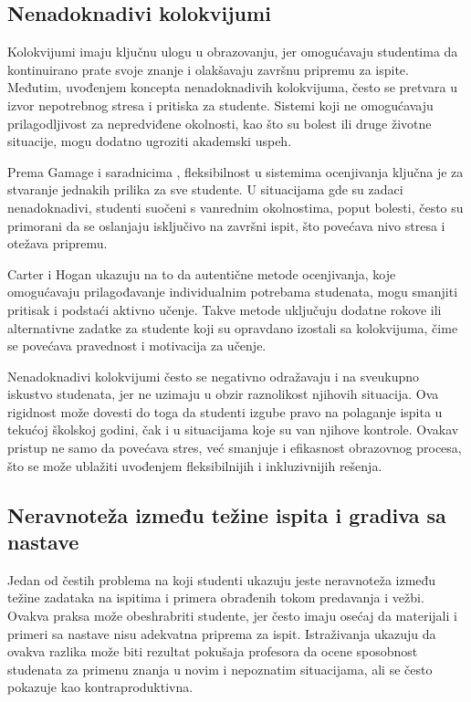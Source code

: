 \documentclass[a4paper]{article}
\begin{document}
\subsection{Nenadoknadivi kolokvijumi}

Kolokvijumi imaju ključnu ulogu u obrazovanju, jer omogućavaju studentima da kontinuirano prate svoje znanje i olakšavaju završnu pripremu za ispite. Međutim, uvođenjem koncepta nenadoknadivih kolokvijuma, često se pretvara u izvor nepotrebnog stresa i pritiska za studente. Sistemi koji ne omogućavaju prilagodljivost za nepredviđene okolnosti, kao što su bolest ili druge životne situacije, mogu dodatno ugroziti akademski uspeh.

Prema Gamage i saradnicima \cite{gamage2022rethinking}, fleksibilnost u sistemima ocenjivanja ključna je za stvaranje jednakih prilika za sve studente. U situacijama gde su zadaci nenadoknadivi, studenti suočeni s vanrednim okolnostima, poput bolesti, često su primorani da se oslanjaju isključivo na završni ispit, što povećava nivo stresa i otežava pripremu.

Carter i Hogan \cite{carter2013authentic} ukazuju na to da autentične metode ocenjivanja, koje omogućavaju prilagođavanje individualnim potrebama studenata, mogu smanjiti pritisak i podstaći aktivno učenje. Takve metode uključuju dodatne rokove ili alternativne zadatke za studente koji su opravdano izostali sa kolokvijuma, čime se povećava pravednost i motivacija za učenje.

Nenadoknadivi kolokvijumi često se negativno odražavaju i na sveukupno iskustvo studenata, jer ne uzimaju u obzir raznolikost njihovih situacija. Ova rigidnost može dovesti do toga da studenti izgube pravo na polaganje ispita u tekućoj školskoj godini, čak i u situacijama koje su van njihove kontrole. Ovakav pristup ne samo da povećava stres, već smanjuje i efikasnost obrazovnog procesa, što se može ublažiti uvođenjem fleksibilnijih i inkluzivnijih rešenja.

\subsection{Neravnoteža između težine ispita i gradiva sa nastave}

Jedan od čestih problema na koji studenti ukazuju jeste neravnoteža između težine zadataka na ispitima i primera obrađenih tokom predavanja i vežbi. Ovakva praksa može obeshrabriti studente, jer često imaju osećaj da materijali i primeri sa nastave nisu adekvatna priprema za ispit. Istraživanja ukazuju da ovakva razlika može biti rezultat pokušaja profesora da ocene sposobnost studenata za primenu znanja u novim i nepoznatim situacijama, ali se često pokazuje kao kontraproduktivna.
\end{document}
